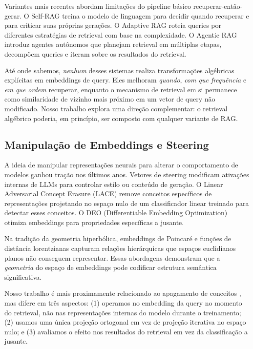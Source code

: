 \documentclass{article}
\begin{document}
Variantes mais recentes abordam limitações do pipeline básico recuperar-então-gerar. O Self-RAG \cite{asai2024} treina o modelo de linguagem para decidir quando recuperar e para criticar suas próprias gerações. O Adaptive RAG \cite{jeong2024} roteia queries por diferentes estratégias de retrieval com base na complexidade. O Agentic RAG \cite{arag2026,agenticrag2025} introduz agentes autônomos que planejam retrieval em múltiplas etapas, decompõem queries e iteram sobre os resultados do retrieval.

Até onde sabemos, \emph{nenhum} desses sistemas realiza transformações algébricas explícitas em embeddings de query. Eles melhoram \emph{quando}, \emph{com que frequência} e \emph{em que ordem} recuperar, enquanto o mecanismo de retrieval em si permanece como similaridade de vizinho mais próximo em um vetor de query não modificado. Nosso trabalho explora uma direção complementar: o retrieval algébrico poderia, em princípio, ser composto com qualquer variante de RAG.

\subsection{Manipulação de Embeddings e Steering}

A ideia de manipular representações neurais para alterar o comportamento de modelos ganhou tração nos últimos anos. Vetores de steering \cite{turner2023} modificam ativações internas de LLMs para controlar estilo ou conteúdo de geração. O Linear Adversarial Concept Erasure (LACE) \cite{ravfogel2022} remove conceitos específicos de representações projetando no espaço nulo de um classificador linear treinado para detectar esses conceitos. O DEO (Differentiable Embedding Optimization) otimiza embeddings para propriedades específicas a jusante.

Na tradição da geometria hiperbólica, embeddings de Poincar\'{e} \cite{nickel2017} e funções de distância lorentzianas capturam relações hierárquicas que espaços euclidianos planos não conseguem representar. Essas abordagens demonstram que a \emph{geometria} do espaço de embeddings pode codificar estrutura semântica significativa.

Nosso trabalho é mais proximamente relacionado ao apagamento de conceitos \cite{ravfogel2022}, mas difere em três aspectos: (1) operamos no embedding da query no momento do retrieval, não nas representações internas do modelo durante o treinamento; (2) usamos uma única projeção ortogonal em vez de projeção iterativa no espaço nulo; e (3) avaliamos o efeito nos resultados do retrieval em vez da classificação a jusante.
\end{document}

